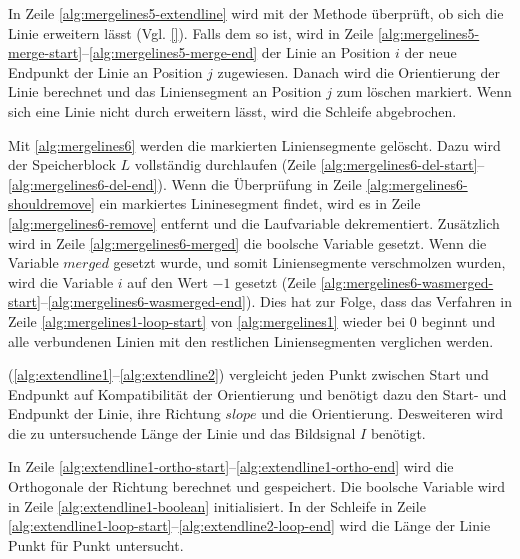 

In Zeile \ref{alg:mergelines5-extendline} wird mit der Methode  überprüft, ob sich die Linie
 erweitern lässt (Vgl. \autoref{}). Falls dem so ist, wird in Zeile
 \ref{alg:mergelines5-merge-start}--\ref{alg:mergelines5-merge-end} der Linie an Position $i$ der neue Endpunkt der
 Linie an Position $j$ zugewiesen. Danach wird die Orientierung der Linie berechnet und das Liniensegment an Position
 $j$ zum löschen markiert. Wenn sich eine Linie nicht durch  erweitern lässt, wird die Schleife
 abgebrochen.

Mit \autoref{alg:mergelines6} werden die markierten Liniensegmente gelöscht. Dazu wird der Speicherblock $L$
 vollständig durchlaufen (Zeile \ref{alg:mergelines6-del-start}--\ref{alg:mergelines6-del-end}). Wenn die Überprüfung
 in Zeile \ref{alg:mergelines6-shouldremove} ein markiertes Lininesegment findet, wird es in Zeile
 \ref{alg:mergelines6-remove} entfernt und die Laufvariable dekrementiert. Zusätzlich wird in Zeile
 \ref{alg:mergelines6-merged} die boolsche Variable gesetzt. Wenn die Variable $\mathit{merged}$ gesetzt wurde, und
 somit Liniensegmente verschmolzen wurden, wird die Variable $i$ auf den Wert $-1$ gesetzt
 (Zeile \ref{alg:mergelines6-wasmerged-start}--\ref{alg:mergelines6-wasmerged-end}). Dies hat zur Folge, dass das
 Verfahren  in Zeile \ref{alg:mergelines1-loop-start} von \autoref{alg:mergelines1} wieder bei $0$
 beginnt und alle verbundenen Linien mit den restlichen Liniensegmenten verglichen werden.



 (\autoref{alg:extendline1}--\autoref{alg:extendline2}) vergleicht jeden Punkt zwischen Start und
 Endpunkt auf Kompatibilität der Orientierung und benötigt dazu den Start- und Endpunkt der Linie, ihre Richtung
 $\mathit{slope}$ und die Orientierung. Desweiteren wird die zu untersuchende Länge der Linie und das Bildsignal $I$
 benötigt.



In Zeile \ref{alg:extendline1-ortho-start}--\ref{alg:extendline1-ortho-end} wird die Orthogonale der Richtung berechnet
 und gespeichert. Die boolsche Variable wird in Zeile \ref{alg:extendline1-boolean} initialisiert. In der Schleife in
 Zeile \ref{alg:extendline1-loop-start}--\ref{alg:extendline2-loop-end} wird die Länge der Linie Punkt für Punkt
 untersucht.

